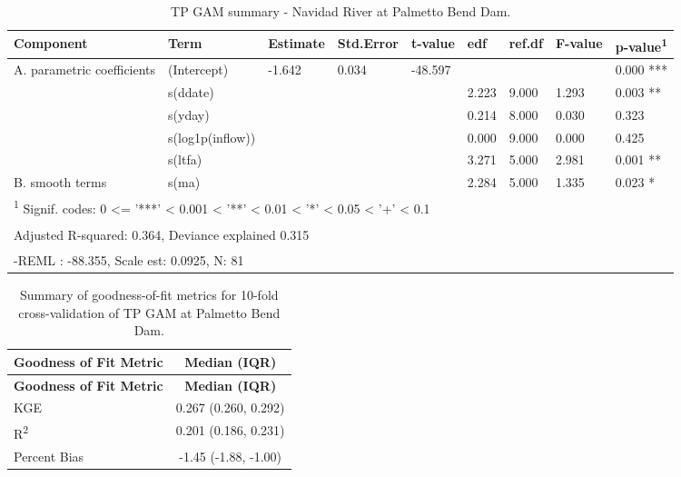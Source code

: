 \documentclass[
]{article}
\newenvironment{widestuff}{\begin{table}[h]\begin{adjustwidth}{-4.5cm}{-4.5cm}\centering}{\end{adjustwidth}\end{table}}
\begin{document}
\begin{widestuff}

\caption{TP GAM summary - Navidad River at Palmetto Bend Dam.}
\centering
\begin{tabular}[t]{lllllllll}
\toprule
Component & Term & Estimate & Std.Error & t-value & edf & ref.df & F-value & p-value\textsuperscript{1}\\
\midrule
A. parametric coefficients & (Intercept) & -1.642 & 0.034 & -48.597 &  &  &  & 0.000 ***\\
\cmidrule{1-9}
 & s(ddate) &  &  &  & 2.223 & 9.000 & 1.293 & 0.003 **\\

 & s(yday) &  &  &  & 0.214 & 8.000 & 0.030 & 0.323\\

 & s(log1p(inflow)) &  &  &  & 0.000 & 9.000 & 0.000 & 0.425\\

 & s(ltfa) &  &  &  & 3.271 & 5.000 & 2.981 & 0.001 **\\

\multirow[t]{-5}{*}{\raggedright\arraybackslash B. smooth terms} & s(ma) &  &  &  & 2.284 & 5.000 & 1.335 & 0.023 *\\
\bottomrule
\multicolumn{9}{l}{\textsuperscript{1} Signif. codes: 0 <= '***' < 0.001 < '**' < 0.01 < '*' < 0.05 < '+' < 0.1}\\
\multicolumn{9}{l}{\textsuperscript{} Adjusted R-squared: 0.364, Deviance explained 0.315}\\
\multicolumn{9}{l}{\textsuperscript{} -REML : -88.355, Scale est: 0.0925, N: 81}\\
\end{tabular}
\end{widestuff}

\hypertarget{tbl-TPPalmettoBend-CV}{}
\begin{longtable}[]{@{}lc@{}}
\caption{\label{tbl-TPPalmettoBend-CV}Summary of goodness-of-fit metrics
for 10-fold cross-validation of TP GAM at Palmetto Bend
Dam.}\tabularnewline
\toprule()
\textbf{Goodness of Fit Metric} & \textbf{Median (IQR)} \\
\midrule()
\endfirsthead
\toprule()
\textbf{Goodness of Fit Metric} & \textbf{Median (IQR)} \\
\midrule()
\endhead
KGE & 0.267 (0.260, 0.292) \\
R\textsuperscript{2} & 0.201 (0.186, 0.231) \\
Percent Bias & -1.45 (-1.88, -1.00) \\
\bottomrule()
\end{longtable}
\end{document}

